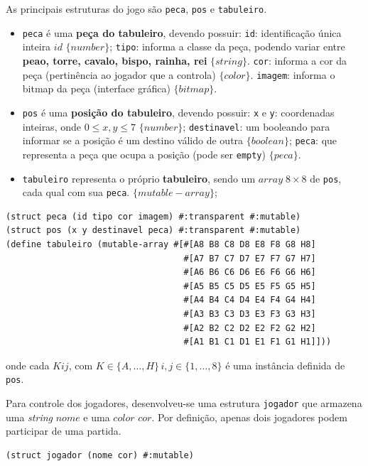 As principais estruturas do jogo são \verb|peca|, \verb|pos| e \verb|tabuleiro|.
\begin{itemize}
		\item \verb|peca| é uma \textbf{peça do tabuleiro}, devendo possuir:
			\subitem \verb|id|: identificação única inteira $id$ $\{number\}$;
			\subitem \verb|tipo|: informa a classe da peça, podendo variar entre \textbf{peao, torre, cavalo, bispo, rainha, rei} $\{string\}$.
			\subitem \verb|cor|: informa a cor da peça (pertinência ao jogador que a controla) $\{color\}$.
			\subitem \verb|imagem|: informa o bitmap da peça (interface gráfica) $\{bitmap\}$.
		\item \verb|pos| é uma \textbf{posição do tabuleiro}, devendo possuir:
			\subitem \verb|x| e \verb|y|: coordenadas inteiras, onde $0 \leq x, y \leq 7$ $\{number\}$;
			\subitem \verb|destinavel|: um booleando para informar se a posição é um destino válido de outra $\{boolean\}$;
			\subitem \verb|peca|: que representa a peça que ocupa a posição (pode ser \verb|empty|) $\{peca\}$.
		\item \verb|tabuleiro| representa o próprio \textbf{tabuleiro}, sendo um $array\; 8\times8$ de \verb|pos|, cada qual com sua \verb|peca|. $\{mutable-array\}$;
\end{itemize}
\begin{Verbatim}[fontsize=\footnotesize]
(struct peca (id tipo cor imagem) #:transparent #:mutable)
(struct pos (x y destinavel peca) #:transparent #:mutable)
(define tabuleiro (mutable-array #[#[A8 B8 C8 D8 E8 F8 G8 H8]
                                   #[A7 B7 C7 D7 E7 F7 G7 H7]
                                   #[A6 B6 C6 D6 E6 F6 G6 H6]
                                   #[A5 B5 C5 D5 E5 F5 G5 H5]
                                   #[A4 B4 C4 D4 E4 F4 G4 H4]
                                   #[A3 B3 C3 D3 E3 F3 G3 H3]
                                   #[A2 B2 C2 D2 E2 F2 G2 H2]
                                   #[A1 B1 C1 D1 E1 F1 G1 H1]]))
\end{Verbatim}
onde cada $Kij$, com $K\in\{A,\dots,H\}\,i,j\in\{1,\dots,8\}$ é uma instância definida de \verb|pos|.

Para controle dos jogadores, desenvolveu-se uma estrutura \verb|jogador| que armazena uma \textit{string} $nome$ e uma $color$ $cor$.
Por definição, apenas dois jogadores podem participar de uma partida.
\begin{Verbatim}[fontsize=\footnotesize]
	(struct jogador (nome cor) #:mutable)
\end{Verbatim}

